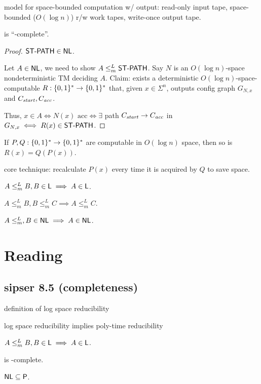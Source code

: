 \documentclass{article}
\begin{document}
model for space-bounded computation w/ output: read-only input tape, space-bounded (\(O(\log n)\)) r/w work tapes, write-once output tape.

\begin{theorem}
   is ``\NL-complete''.
\end{theorem}

\begin{proof}
  \( \text{\sf ST-PATH} \in \text{\sf NL} \).

  Let \(A \in \text{\sf NL}\), we need to show \(A \leq_m^L \text{\sf ST-PATH}\).
  Say \(N\) is an \(O(\log n)\)-space nondeterministic TM deciding \(A\).
  Claim: exists a deterministic \(O(\log n)\)-space-computable \(R: \lbrace0, 1\rbrace^* \to \lbrace0, 1\rbrace^*\) that, given \(x \in \Sigma^n\), outputs config graph \(G_{N, x}\) and \(C_{\it start}, C_{\it acc}\).

  Thus, \(x \in A \iff N(x) \text{ acc} \iff \exists\) path \(C_{\it start} \to C_{\it acc} \) in \(G_{N, x} \iff R(x) \in \text{\sf ST-PATH}\).
\end{proof}

\begin{theorem}
  If \(P, Q: \lbrace0, 1\rbrace^* \to \lbrace0, 1\rbrace^*\) are computable in \(O(\log n)\) space, then so is \(R(x) = Q(P(x))\).
\end{theorem}

core technique: recalculate \(P(x)\) every time it is acquired by \(Q\) to save space.

\begin{corollary}[closure]
  \(A \leq_m^L B, B \in \text{\sf L} \implies A \in \text{\sf L}\).
\end{corollary}

\begin{corollary}[transitivity]
  \(A \leq_m^L B, B \leq_m^L C \implies A \leq_m^L C\).
\end{corollary}

\begin{exercise}
  \(A \leq_m^L, B \in \text{\sf NL} \implies A \in \text{\sf NL}\).
\end{exercise}

\section{Reading}

\subsection{sipser 8.5 (\NL completeness)}

definition of log space reducibility

log space reducibility implies poly-time reducibility

\begin{theorem}
  \(A \leq_m^L B, B \in \text{\sf L} \implies A \in \text{\sf L}\).
\end{theorem}

\begin{theorem}
   is \NL-complete.
\end{theorem}

\begin{corollary}
  \( \text{\sf NL} \subseteq \text{\sf P} \).
\end{corollary}
\end{document}
